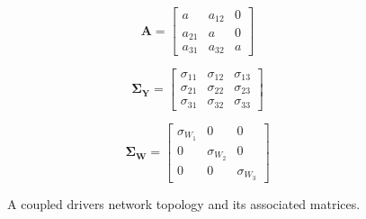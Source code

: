 \documentclass{article}
\begin{document}
\begin{figure}[H]
\centering

\def\figscale{1}

\begin{minipage}[c]{0.23\textwidth}
\centering

\def\a{1.2 cm}
\def\nodeSize{0.7}
\def\selfLoopR{0.5*\nodeSize cm}


\end{minipage}%
\hspace{0\textwidth}%
\begin{minipage}[c]{0.23\textwidth}
\raggedright

\[
\mathbf{A}=
\begin{bmatrix}
a & a_{12} & 0 \\
a_{21} & a & 0 \\
a_{31} & a_{32} & a
\end{bmatrix}
\]

\end{minipage}%
\hspace{0.005\textwidth}%
\begin{minipage}[c]{0.25\textwidth}
\raggedright

\[
\mathbf{\Sigma_Y}=
\begin{bmatrix}
\sigma_{11} & \sigma_{12} & \sigma_{13} \\
\sigma_{21} & \sigma_{22} & \sigma_{23} \\
\sigma_{31} & \sigma_{32} & \sigma_{33}
\end{bmatrix}
\]

\end{minipage}%
\hspace{0.005\textwidth}%
\begin{minipage}[c]{0.27\textwidth}
\raggedright

\[
\mathbf{\Sigma_W}=
\begin{bmatrix}
\sigma_{W_1} & 0 & 0 \\
0 & \sigma_{W_2} & 0 \\
0 & 0 & \sigma_{W_3}
\end{bmatrix}
\]

\end{minipage}%

\caption{A coupled drivers network topology and its associated matrices.}
\label{fig:network_coupled}
\end{figure}
\end{document}
